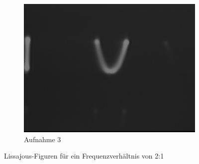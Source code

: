 \documentclass[bigchapter,colorback,accentcolor=tud4b,linedtoc,11pt]{tudreport}
\begin{document}
\begin{figure}[H]
\begin{subfigure}[h]{0.32\textwidth}
    \includegraphics[width=\textwidth]{data/Aufgabe7/2-1-y.png}
    \caption[Cap for listoffigures]{Aufnahme 3}
  \end{subfigure}%
  \caption{Lissajous-Figuren für ein Frequenzverhältnis von 2:1}
\end{figure}
\end{document}
